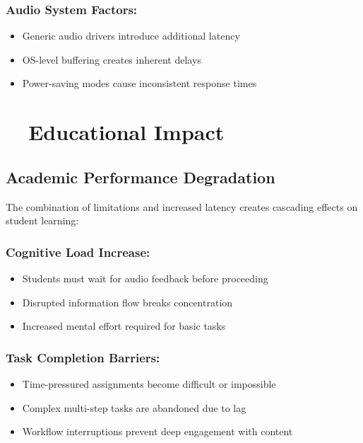 \subsubsection{Audio System Factors:}

\begin{itemize}
	\item Generic audio drivers introduce additional \gls{latency} \supercite{ASIO4ALL2023Latency}
	\item OS-level buffering creates inherent delays \supercite{LinuxAudioLatency}
	\item Power-saving modes cause inconsistent response times \supercite{WindowsPowerManagement}
\end{itemize}


\section{~~Educational Impact}\label{educational-impact}

\subsection{Academic Performance Degradation}\label{academic-performance-degradation}

The combination of  limitations and increased latency creates cascading effects on student learning:

\subsubsection{Cognitive Load Increase:}
\begin{itemize}
	\item Students must wait for audio feedback before proceeding \supercite{Sweller1988CognitiveLoadTheory}
	\item Disrupted information flow breaks concentration \supercite{Parasuraman2008CognitiveWorkload}
	\item Increased mental effort required for basic  tasks \supercite{Wickens2008MultipleResourceTheory}
\end{itemize}

\subsubsection{Task Completion Barriers:}

\begin{itemize}
	\item Time-pressured assignments become difficult or impossible \supercite{Adams2000ImpactOfTechnology}
	\item Complex multi-step tasks are abandoned due to lag \supercite{Kirschner2006WhyMinimalGuidance}
	\item Workflow interruptions prevent deep engagement with content \supercite{Pashler1994DualTaskInterference}
\end{itemize}


